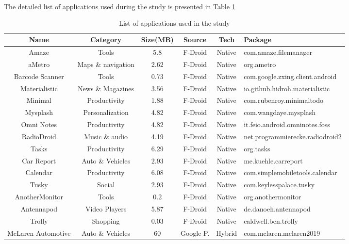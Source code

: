 The detailed list of applications used during the study is presented in Table \ref{appsTable}

\begin{table}[t]
	\centering
	\caption{List of applications used in the study}
	\label{appsTable}
	\begin{adjustbox}{width=\textwidth}
		\begin{tabular}{|c|c|c|c|c|l|}
			\hline
			\textbf{Name} & \textbf{Category} & \textbf{Size\tiny{(MB)}} & \textbf{Source} & \textbf{Tech} &\textbf{Package}  \\ \hline
			Amaze&Tools&5.8&F-Droid&Native&\small{com.amaze.filemanager}\\ \hline
			aMetro&Maps \& navigation& 2.62&F-Droid&Native&\small{org.ametro}\\ \hline
			Barcode Scanner&Tools&0.73&F-Droid&Native&\small{com.google.zxing.client.android}\\ \hline
			Materialistic&News \& Magazines&3.56&F-Droid&Native&\small{io.github.hidroh.materialistic}\\ \hline
			Minimal&Productivity&1.88&F-Droid&Native&\small{com.rubenroy.minimaltodo}\\ \hline
			Mysplash&Personalization&4.82&F-Droid&Native&\small{com.wangdaye.mysplash}\\ \hline
			Omni Notes&Productivity&4.82&F-Droid&Native&\small{it.feio.android.omninotes.foss}\\ \hline
			RadioDroid&Music \& audio&4.19&F-Droid&Native&\small{net.programmierecke.radiodroid2}\\ \hline
			Tasks&Productivity&6.29&F-Droid&Native&\small{org.tasks} \\ \hline
			Car Report&Auto \& Vehicles&2.93&F-Droid&Native&\small{me.kuehle.carreport}\\ \hline
			Calendar&Productivity& 6.08&F-Droid&Native&\small{com.simplemobiletools.calendar}\\ \hline
			Tusky&Social&2.93&F-Droid&Native&\small{com.keylesspalace.tusky}\\ \hline
			AnotherMonitor&Tools&0.2&F-Droid&Native&\small{org.anothermonitor}\\ \hline
			Antennapod&Video Players&5.87&F-Droid&Native&\small{de.danoeh.antennapod}\\ \hline
			Trolly&Shopping&0.03&F-Droid&Native&\small{caldwell.ben.trolly}\\ \hline
			McLaren Automotive&Auto \& Vehicles&60&Google P.&Hybrid&\small{com.mclaren.mclaren2019}\\ \hline

\end{tabular}
\end{adjustbox}
\end{table}
